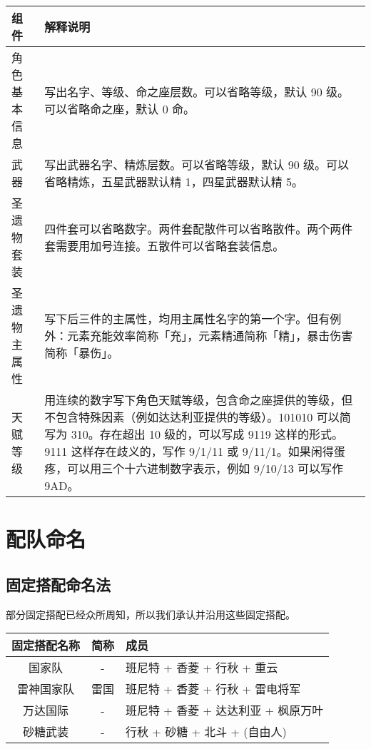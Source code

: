 \noindent\begin{tabu} {|l|X|}
	\hline
	{组件}         & {解释说明}                                                                                                                                                                                                        \\
	\hline
	{角色基本信息} & {写出名字、等级、命之座层数。可以省略等级，默认 90 级。可以省略命之座，默认 0 命。}                                                                                                                               \\
	{武器}         & {写出武器名字、精炼层数。可以省略等级，默认 90 级。可以省略精炼，五星武器默认精 1，四星武器默认精 5。}                                                                                                            \\
	{圣遗物套装}   & {四件套可以省略数字。两件套配散件可以省略散件。两个两件套需要用加号连接。五散件可以省略套装信息。}                                                                                                                \\
	{圣遗物主属性} & {写下后三件的主属性，均用主属性名字的第一个字。但有例外：元素充能效率简称「充」，元素精通简称「精」，暴击伤害简称「暴伤」。}                                                                                      \\
	{天赋等级}     & {用连续的数字写下角色天赋等级，包含命之座提供的等级，但不包含特殊因素（例如达达利亚提供的等级）。101010 可以简写为 310。存在超出 10 级的，可以写成 9119 这样的形式。9111 这样存在歧义的，写作 9/1/11 或 9/11/1。如果闲得蛋疼，可以用三个十六进制数字表示，例如 9/10/13 可以写作 9AD。} \\
	\hline
\end{tabu}


\section{配队命名}

\subsection{固定搭配命名法}

部分固定搭配已经众所周知，所以我们承认并沿用这些固定搭配。

\noindent\begin{tabu}{|c|c|X[c]|}
	\hline
	{固定搭配名称} & {简称} & {成员}                                \\
	\hline
	{国家队}       & {-}    & {班尼特 + 香菱 + 行秋 + 重云}         \\
	{雷神国家队}   & {雷国} & {班尼特 + 香菱 + 行秋 + 雷电将军}     \\
	{万达国际}     & {-}    & {班尼特 + 香菱 + 达达利亚 + 枫原万叶} \\
	{砂糖武装}     & {-}    & {行秋 + 砂糖 + 北斗 + (自由人)} \\
	\hline
\end{tabu}

